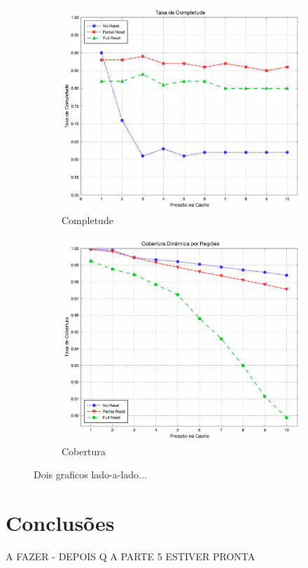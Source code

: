 \documentclass[12pt,twoside]{article}
\begin{document}
\begin{figure}[h!]
        \centering
        \begin{subfigure}[b]{0.45\textwidth}
                \includegraphics[width=\textwidth]{./figs/completion-reset}
                \caption{Completude}
                \label{fig-completude1}
        \end{subfigure}
        \quad %
                \begin{subfigure}[b]{0.45\textwidth}
                \includegraphics[width=\textwidth]{./figs/region-coverage-reset}
                \caption{Cobertura}
                \label{fig-cobertura1}
        \end{subfigure}
\caption{Dois graficos lado-a-lado...}
\end{figure}

\newpage

\section{Conclusões}
\begin{large}
A FAZER - DEPOIS Q A PARTE 5 ESTIVER PRONTA
\end{large}




\end{document}
